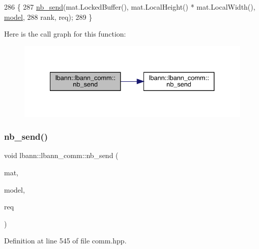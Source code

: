 \begin{DoxyCode}
286                                                       \{
287   \hyperlink{classlbann_1_1lbann__comm_a70679ca6477c56972f9bc53d52e5ce21}{nb\_send}(mat.LockedBuffer(), mat.LocalHeight() * mat.LocalWidth(), \hyperlink{namespacelbann_adee41f31f15f3906cbdcce4a1417eb56a20f35e630daf44dbfa4c3f68f5399d8c}{model},
288           rank, req);
289 \}
\end{DoxyCode}
Here is the call graph for this function\+:\nopagebreak
\begin{figure}[H]
\begin{center}
\leavevmode
\includegraphics[width=334pt]{classlbann_1_1lbann__comm_ad77344b63311b7ec57c63af67120c3e6_cgraph}
\end{center}
\end{figure}
\mbox{\label{classlbann_1_1lbann__comm_a7d22130a7d24a710fe6b31c0ccec78b1}} 
\subsubsection{\texorpdfstring{nb\+\_\+send()}{nb\_send()}\hspace{0.1cm}{\footnotesize\ttfamily [5/6]}}
{\footnotesize\ttfamily void lbann\+::lbann\+\_\+comm\+::nb\+\_\+send (\begin{DoxyParamCaption}\item[{const \hyperlink{base_8hpp_a68f11fdc31b62516cb310831bbe54d73}{Mat} \&}]{mat,  }\item[{int}]{model,  }\item[{El\+::mpi\+::\+Request$<$ Data\+Type $>$ \&}]{req }\end{DoxyParamCaption})\hspace{0.3cm}{\ttfamily [inline]}}



Definition at line 545 of file comm.\+hpp.


